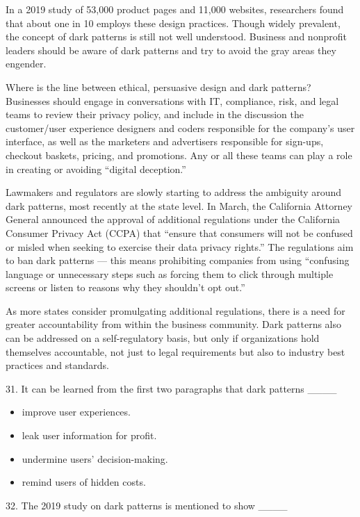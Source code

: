 \documentclass[UTF8,11pt]{ctexart}
\begin{document}
In a 2019 study of 53,000 product pages and 11,000 websites, researchers found that about one in 10 employs these design practices. Though widely prevalent, the concept of dark patterns is still not well understood. Business and nonprofit leaders should be aware of dark patterns and try to avoid the gray areas they engender.


Where is the line between ethical, persuasive design and dark patterns? Businesses should engage in conversations with IT, compliance, risk, and legal teams to review their privacy policy, and include in the discussion the customer/user experience designers and coders responsible for the company’s user interface, as well as the marketers and advertisers responsible for sign-ups, checkout baskets, pricing, and promotions. Any or all these teams can play a role in creating or avoiding “digital deception.”


Lawmakers and regulators are slowly starting to address the ambiguity around dark patterns, most recently at the state level. In March, the California Attorney General announced the approval of additional regulations under the California Consumer Privacy Act (CCPA) that “ensure that consumers will not be confused or misled when seeking to exercise their data privacy rights.” The regulations aim to ban dark patterns — this means prohibiting companies from using “confusing language or unnecessary steps such as forcing them to click through multiple screens or listen to reasons why they shouldn’t opt out.”


As more states consider promulgating additional regulations, there is a need for greater accountability from within the business community. Dark patterns also can be addressed on a self-regulatory basis, but only if organizations hold themselves accountable, not just to legal requirements but also to industry best practices and standards.


31. It can be learned from the first two paragraphs that dark patterns \_\_\_\_


\begin{itemize}[leftmargin=2em,itemsep=.2em,topsep=.4em]\item[A.] improve user experiences.
\item[B.] leak user information for profit.
\item[C.] undermine users’ decision-making.
\item[D.] remind users of hidden costs.
\end{itemize}

32. The 2019 study on dark patterns is mentioned to show \_\_\_\_
\end{document}
